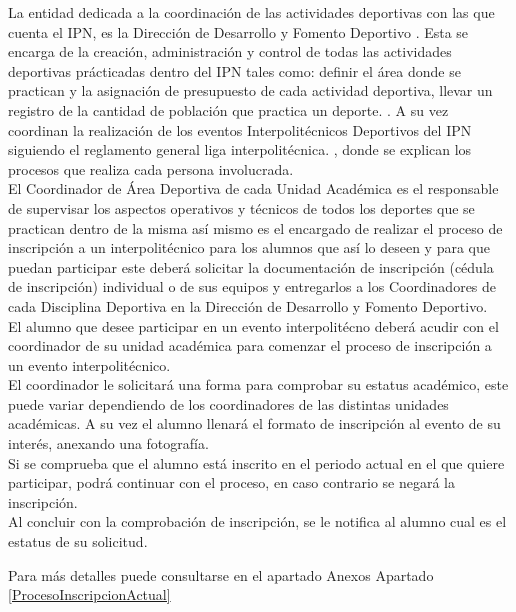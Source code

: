 \noindent La entidad dedicada a la coordinación de las actividades deportivas con las que cuenta el IPN, es la Dirección de Desarrollo y Fomento Deportivo \cite{DDYFD}. Esta se encarga de la creación, administración y control de todas las actividades deportivas prácticadas dentro del IPN tales como: definir el área donde se practican y la asignación de presupuesto de cada actividad deportiva, llevar un registro de la cantidad de población que practica un deporte. \cite{Reglamento}.	
\noindent A su vez coordinan la realización de los eventos Interpolitécnicos Deportivos del IPN siguiendo el reglamento general liga interpolitécnica. \cite{Reglamento}, donde se explican los  procesos que realiza cada persona involucrada.\\
\noindent El Coordinador de Área Deportiva de cada Unidad Académica es el responsable de supervisar los aspectos operativos y técnicos de todos los deportes que se practican dentro de la misma así mismo es el encargado de realizar el proceso de inscripción a un interpolitécnico para los alumnos que así lo deseen y para que puedan participar este deberá solicitar la documentación de inscripción (cédula de inscripción) individual o de sus equipos y entregarlos a los Coordinadores de cada Disciplina Deportiva en la Dirección de Desarrollo y Fomento Deportivo. \cite{Reglamento} \\
\noindent  El alumno que desee participar en un evento interpolitécno deberá acudir con el coordinador de su unidad académica para comenzar el proceso de inscripción a un evento interpolitécnico. 
\\El coordinador le solicitará una forma para comprobar su estatus académico, este puede variar dependiendo de los coordinadores de las distintas unidades académicas. A su vez el alumno llenará el formato de inscripción al evento de su interés, anexando una fotografía. 
\\ Si se comprueba que el alumno está inscrito en el periodo actual en el que quiere participar, podrá continuar con el proceso, en caso contrario se negará la inscripción. \cite{Reglamento}
\\ Al concluir con la comprobación de inscripción, se le notifica al alumno cual es el estatus de su solicitud. 

\noindent Para más detalles puede consultarse en el apartado Anexos Apartado \ref{ProcesoInscripcionActual}


